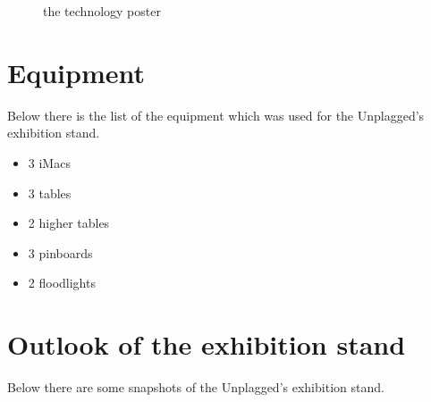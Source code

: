 \begin{figure}[!h]
  \centering
  \caption{the technology poster}
  \label{fig:poster_technical}
\end{figure}

\pagebreak 

\section{Equipment}
Below there is the list of the equipment which was used for the Unplagged's exhibition stand.

\begin{itemize}
\item 3 iMacs
\item 3 tables
\item 2 higher tables
\item 3 pinboards
\item 2 floodlights
\end{itemize}

\pagebreak 

\section{Outlook of the exhibition stand}
Below there are some snapshots of the Unplagged's exhibition stand.


